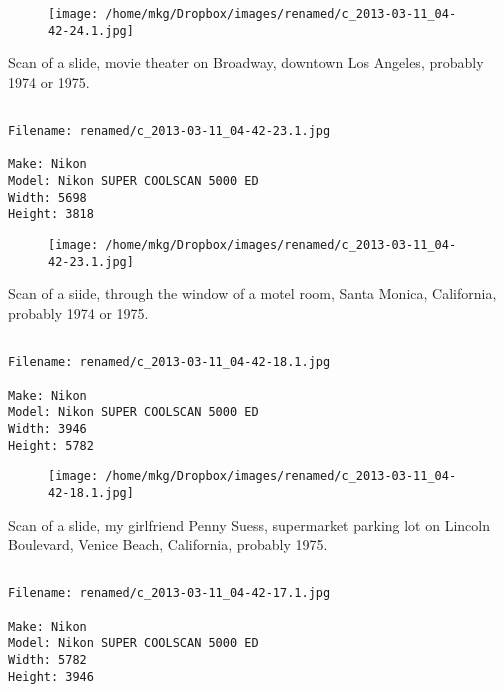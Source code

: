 \begin{figure}
\texttt{[image: /home/mkg/Dropbox/images/renamed/c\_2013-03-11\_04-42-24.1.jpg]}
\end{figure}
    
\clearpage
\onecolumn
\noindent Scan of a slide, movie theater on Broadway, downtown Los Angeles, probably 1974 or 1975.
\noindent
\begin{lstlisting}

Filename: renamed/c_2013-03-11_04-42-23.1.jpg

Make: Nikon
Model: Nikon SUPER COOLSCAN 5000 ED
Width: 5698
Height: 3818
\end{lstlisting}
\clearpage

\begin{figure}
\texttt{[image: /home/mkg/Dropbox/images/renamed/c\_2013-03-11\_04-42-23.1.jpg]}
\end{figure}
    
\clearpage
\onecolumn
\noindent Scan of a siide, through the window of a motel room, Santa Monica, California, probably 1974 or 1975.
\noindent
\begin{lstlisting}

Filename: renamed/c_2013-03-11_04-42-18.1.jpg

Make: Nikon
Model: Nikon SUPER COOLSCAN 5000 ED
Width: 3946
Height: 5782
\end{lstlisting}
\clearpage

\begin{figure}
\texttt{[image: /home/mkg/Dropbox/images/renamed/c\_2013-03-11\_04-42-18.1.jpg]}
\end{figure}
    
\clearpage
\onecolumn
\noindent Scan of a slide, my girlfriend Penny Suess, supermarket parking lot on Lincoln Boulevard, Venice Beach, California, probably 1975.
\noindent
\begin{lstlisting}

Filename: renamed/c_2013-03-11_04-42-17.1.jpg

Make: Nikon
Model: Nikon SUPER COOLSCAN 5000 ED
Width: 5782
Height: 3946
\end{lstlisting}
\clearpage

